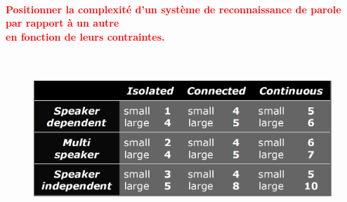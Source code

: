\documentclass[letterpaper, 12pt]{article}
\newcommand{\red}[1]{
	\textcolor{red}{#1}
}
\begin{document}
		\paragraph{\red{Positionner la complexité d'un système de reconnaissance de parole par rapport à un autre 
		~\\ \hspace*{0.035cm} en fonction de leurs contraintes.}}~\\
			\begin{figure}[H]
				\centering
				\includegraphics[scale=0.25]{Images/complexity}
			\end{figure}\noindent
\end{document}
